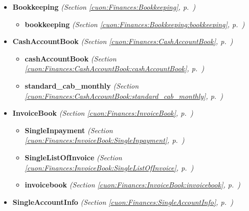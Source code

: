 \begin{itemize}
\setlength{\parskip}{0ex}
\item \textbf{Bookkeeping}
  \textit{(Section \ref{cuon:Finances:Bookkeeping}, p.~\pageref{cuon:Finances:Bookkeeping})}

  \begin{itemize}
\setlength{\parskip}{0ex}
    \item \textbf{bookkeeping}
  \textit{(Section \ref{cuon:Finances:Bookkeeping:bookkeeping}, p.~\pageref{cuon:Finances:Bookkeeping:bookkeeping})}

  \end{itemize}
\item \textbf{CashAccountBook}
  \textit{(Section \ref{cuon:Finances:CashAccountBook}, p.~\pageref{cuon:Finances:CashAccountBook})}

  \begin{itemize}
\setlength{\parskip}{0ex}
    \item \textbf{cashAccountBook}
  \textit{(Section \ref{cuon:Finances:CashAccountBook:cashAccountBook}, p.~\pageref{cuon:Finances:CashAccountBook:cashAccountBook})}

    \item \textbf{standard\_cab\_monthly}
  \textit{(Section \ref{cuon:Finances:CashAccountBook:standard_cab_monthly}, p.~\pageref{cuon:Finances:CashAccountBook:standard_cab_monthly})}

  \end{itemize}
\item \textbf{InvoiceBook}
  \textit{(Section \ref{cuon:Finances:InvoiceBook}, p.~\pageref{cuon:Finances:InvoiceBook})}

  \begin{itemize}
\setlength{\parskip}{0ex}
    \item \textbf{SingleInpayment}
  \textit{(Section \ref{cuon:Finances:InvoiceBook:SingleInpayment}, p.~\pageref{cuon:Finances:InvoiceBook:SingleInpayment})}

    \item \textbf{SingleListOfInvoice}
  \textit{(Section \ref{cuon:Finances:InvoiceBook:SingleListOfInvoice}, p.~\pageref{cuon:Finances:InvoiceBook:SingleListOfInvoice})}

    \item \textbf{invoicebook}
  \textit{(Section \ref{cuon:Finances:InvoiceBook:invoicebook}, p.~\pageref{cuon:Finances:InvoiceBook:invoicebook})}

  \end{itemize}
\item \textbf{SingleAccountInfo}
  \textit{(Section \ref{cuon:Finances:SingleAccountInfo}, p.~\pageref{cuon:Finances:SingleAccountInfo})}


\end{itemize}

